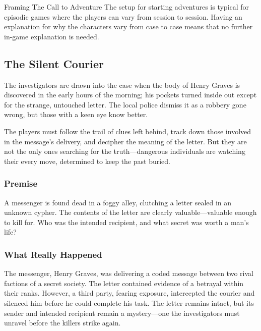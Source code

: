 \begin{WyrdComment}{Framing The Call to Adventure}
	The setup for starting adventures is typical for episodic games where the players can vary from session to session. Having an explanation for why the characters vary from case to case means that no further in-game explanation is needed.
\end{WyrdComment}



%





\subsection{The Silent Courier}

The investigators are drawn into the case when the body of Henry Graves is discovered in the early hours of the morning; his pockets turned inside out except for the strange, untouched letter. The local police dismiss it as a robbery gone wrong, but those with a keen eye know better.

The players must follow the trail of clues left behind, track down those involved in the message’s delivery, and decipher the meaning of the letter. But they are not the only ones searching for the truth—dangerous individuals are watching their every move, determined to keep the past buried.

\subsubsection{Premise} 
A messenger is found dead in a foggy alley, clutching a letter sealed in an unknown cypher. The contents of the letter are clearly valuable—valuable enough to kill for. Who was the intended recipient, and what secret was worth a man’s life?

\subsubsection{What Really Happened} 
The messenger, Henry Graves, was delivering a coded message between two rival factions of a secret society. The letter contained evidence of a betrayal within their ranks. However, a third party, fearing exposure, intercepted the courier and silenced him before he could complete his task. The letter remains intact, but its sender and intended recipient remain a mystery—one the investigators must unravel before the killers strike again.


